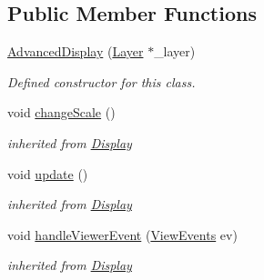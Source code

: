\subsection*{Public Member Functions}
\begin{DoxyCompactItemize}
\item 
\hyperlink{class_advanced_display_a12f2ccc1e24ed1d6d9a68cea1447166f}{Advanced\+Display} (\hyperlink{class_layer}{Layer} $\ast$\+\_\+layer)
\begin{DoxyCompactList}\small\item\em Defined constructor for this class. \end{DoxyCompactList}\item 
\mbox{\label{class_advanced_display_ad7aecdae6c1cdcb51f7fbec7136b5795}} 
void \hyperlink{class_advanced_display_ad7aecdae6c1cdcb51f7fbec7136b5795}{change\+Scale} ()
\begin{DoxyCompactList}\small\item\em inherited from \hyperlink{class_display}{Display} \end{DoxyCompactList}\item 
\mbox{\label{class_advanced_display_a8f1a3ff301cf6261d6c40296d9a926f8}} 
void \hyperlink{class_advanced_display_a8f1a3ff301cf6261d6c40296d9a926f8}{update} ()
\begin{DoxyCompactList}\small\item\em inherited from \hyperlink{class_display}{Display} \end{DoxyCompactList}\item 
\mbox{\label{class_advanced_display_ae7ce015fcaf05f4a34c123bff64ebb2e}} 
void \hyperlink{class_advanced_display_ae7ce015fcaf05f4a34c123bff64ebb2e}{handle\+Viewer\+Event} (\hyperlink{_events_8h_a7e30376069ab6f940d101ae67eb3fb34}{View\+Events} ev)
\begin{DoxyCompactList}\small\item\em inherited from \hyperlink{class_display}{Display} \end{DoxyCompactList}\end{DoxyCompactItemize}
